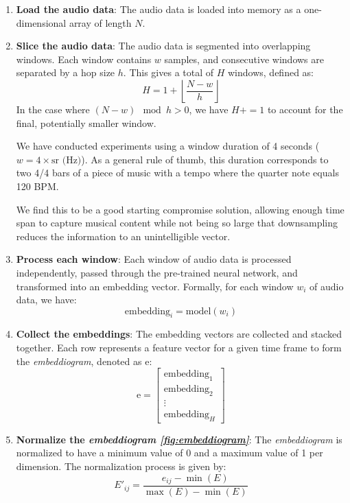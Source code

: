 \begin{enumerate}
\item \textbf{Load the audio data}: The audio data is loaded into memory as a one-dimensional array of length $N$.

\item \textbf{Slice the audio data}: The audio data is segmented into overlapping windows. Each window contains $w$ samples, and consecutive windows are separated by a hop size $h$. This gives a total of $H$ windows, defined as:
\begin{equation}
H = 1 + \left\lfloor \frac{N - w}{h} \right\rfloor
\end{equation}
In the case where $\left( N - w \right) \mod h > 0$, we have $H += 1$ to account for the final, potentially smaller window.

We have conducted experiments using a window duration of 4 seconds (\(w = 4 \times \text{{sr (Hz)}}\)). As a general rule of thumb, this duration corresponds to two 4/4 bars of a piece of music with a tempo where the quarter note equals 120 BPM.

We find this to be a good starting compromise solution, allowing enough time span to capture musical content while not being so large that downsampling reduces the information to an unintelligible vector.

\item \textbf{Process each window}: Each window of audio data is processed independently, passed through the pre-trained neural network, and transformed into an embedding vector. Formally, for each window $w_i$ of audio data, we have:
\begin{equation}
\text{embedding}_i = \text{model}(w_i)
\end{equation}

\item \textbf{Collect the embeddings}: The embedding vectors are collected and stacked together. Each row represents a feature vector for a given time frame to form the \textit{embeddiogram}, denoted as $\text{e}$:
\begin{equation}
\text{e} = \begin{bmatrix} \text{embedding}_1 \\ \text{embedding}_2 \\ \vdots \\ \text{embedding}_H \end{bmatrix}
\end{equation}

\item \textbf{Normalize the \textit{embeddiogram \ref{fig:embeddiogram}}}: The \textit{embeddiogram} is normalized to have a minimum value of 0 and a maximum value of 1 per dimension. The normalization process is given by:
\begin{equation}
E'_{ij} = \frac{e_{ij} - \min(E)}{\max(E) - \min(E)}
\end{equation}
\end{enumerate}

